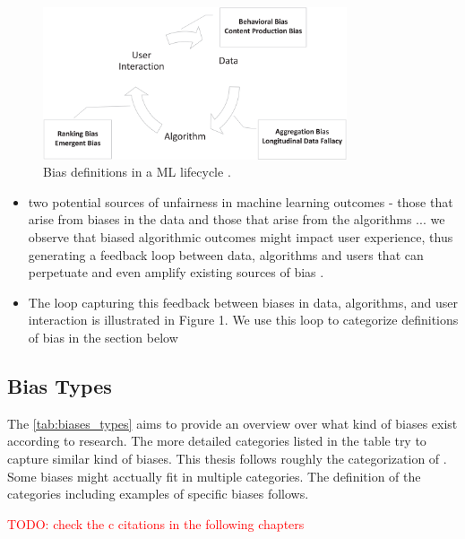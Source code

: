 \documentclass[12pt, a4paper, oneside]{book}   	%
\renewcommand{\todo}[1]{\textcolor{red}{TODO: #1}}
\newif\ifrawcitationactive
\newcommand{\rawcitationusedstart}{\color{violet}}
\newcommand{\rawcitationusedend}{%
	\ifrawcitationactive
	\color{purple}  %
	\else
	\color{black}  %
	\fi
}
\begin{document}
			\begin{figure}[H]
				\centering
				\includegraphics[width=0.8\textwidth]{figures/BiasCategoriesInMLLifecycle.png}
				\caption{Bias definitions in a ML lifecycle \autocite{Mehrabi_2021}.}
				\label{fig:bias_definitions_ML_lifecycle}
			\end{figure}
			
			\rawcitationusedstart
			\begin{itemize}
				\item two potential sources of unfairness in machine learning outcomes - those that arise from biases in the data and those that arise from the algorithms ... we observe that biased algorithmic outcomes might impact user experience, thus generating a feedback loop between data, algorithms and users that can perpetuate and even amplify existing sources of bias \autocite{Mehrabi_2021}.
				\item The loop capturing this feedback between biases in data, algorithms, and user interaction is illustrated in Figure 1. We use this loop to categorize definitions of bias in the section below \autocite{Mehrabi_2021}
			\end{itemize}
			\rawcitationusedend
			
			
			\subsection{Bias Types}
			 The \autoref{tab:biases_types} aims to provide an overview over what kind of biases exist according to research. The more detailed categories listed in the table try to capture similar kind of biases. This thesis follows roughly the categorization of \cite{Mehrabi_2021}. Some biases might acctually fit in multiple categories. The definition of the categories including examples of specific biases follows.
			
			\todo{check the c citations in the following chapters}
			
\end{document}
